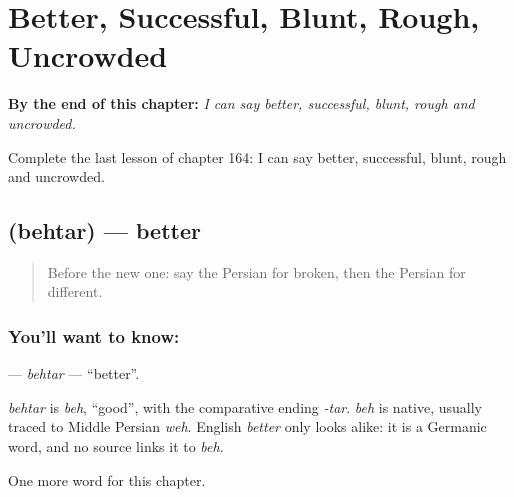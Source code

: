 
\chapter{Better, Successful, Blunt, Rough, Uncrowded}
\label{ch:fa-better-successful-blunt-rough-uncrowded}

\begin{chapteropening}
\textbf{By the end of this chapter:} \emph{I can say better, successful, blunt, rough and uncrowded.}

Complete the last lesson of chapter 164: I can say better, successful, blunt, rough and uncrowded.
\end{chapteropening}

\section[\texorpdfstring{\fa{بهتر} (behtar)}{بهتر (behtar)}]{ (behtar) — better}

\label{lesson:FA-C164-behtar}



\begin{quote}
Before the new one: say the Persian for broken, then the Persian for different.
\end{quote}

\subsection*{You'll want to know: }
\textbf{} — \emph{behtar} — \textquotedblleft{}better\textquotedblright{}.

\begin{cousinweb}
\emph{behtar} is \emph{beh}, \textquotedblleft{}good\textquotedblright{}, with the comparative ending \emph{-tar}. \emph{beh} is native, usually traced to Middle Persian \emph{weh}. English \emph{better} only looks alike: it is a Germanic word, and no source links it to \emph{beh}.
\end{cousinweb}

\begin{grammarlens}[title={What you've built}]
One more word for this chapter.
\end{grammarlens}

